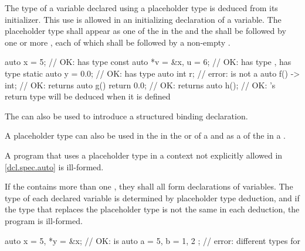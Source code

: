 \pnum
The type of a variable declared using a placeholder type is
deduced from its initializer.
This use is allowed
in an initializing declaration of a variable.
The placeholder type shall appear as one of the
 in the
 and the
shall be followed by one or more
,
each of which shall
be followed by a non-empty
.
\begin{example}
\begin{codeblock}
auto x = 5;                     // OK:  has type 
const auto *v = &x, u = 6;      // OK:  has type ,  has type 
static auto y = 0.0;            // OK:  has type 
auto int r;                     // error:  is not a 
auto f() -> int;                // OK:  returns 
auto g() { return 0.0; }        // OK:  returns 
auto h();                       // OK: 's return type will be deduced when it is defined
\end{codeblock}
\end{example}
The  
can also be used to introduce
a structured binding declaration.

\pnum
A placeholder type can also be used
in the  in
the  or  of a
and as a 
of the 
in a .

\pnum
A program that uses a placeholder type in a context not
explicitly allowed in \ref{dcl.spec.auto} is ill-formed.

\pnum
If the  contains more than one
, they shall all form declarations of
variables. The type of each declared variable is determined
by placeholder type deduction,
and if the type that replaces the placeholder type is not the
same in each deduction, the program is ill-formed.

\begin{example}
\begin{codeblock}
auto x = 5, *y = &x;            // OK:  is 
auto a = 5, b = { 1, 2 };       // error: different types for 
\end{codeblock}
\end{example}

